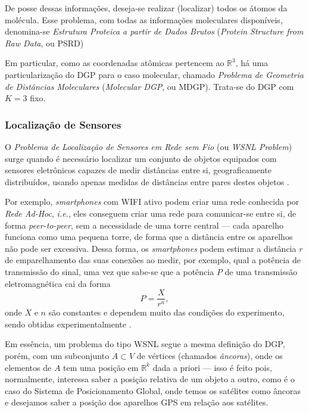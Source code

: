 De posse dessas informações, deseja-se realizar (localizar) todos os átomos da molécula. Esse problema, com todas as informações moleculares disponíveis, denomina-se \textit{Estrutura Proteica a partir de Dados Brutos} (\textit{Protein Structure from Raw Data}, ou PSRD)

Em particular, como as coordenadas atômicas pertencem ao $\mathbb{R}^3$, há uma particularização do DGP para o caso molecular, chamado \textit{Problema de Geometria de Distâncias Moleculares} (\textit{Molecular DGP}, ou MDGP). Trata-se do DGP com $K = 3$ fixo.

\subsubsection{Localização de Sensores}

O \textit{Problema de Localização de Sensores em Rede sem Fio} (ou \textit{WSNL Problem}) surge quando é necessário localizar um conjunto de objetos equipados com sensores eletrônicos capazes de medir distâncias entre si, geograficamente distribuídos, usando apenas medidas de distâncias entre pares destes objetos \cite{yemini1978positioning}. 

Por exemplo, \textit{smartphones} com WIFI ativo podem criar uma rede conhecida por \textit{Rede Ad-Hoc}, \textit{i.e.}, eles conseguem criar uma rede para comunicar-se entre si, de forma \textit{peer-to-peer}, sem a necessidade de uma torre central --- cada aparelho funciona como uma pequena torre, de forma que a distância entre os aparelhos não pode ser excessiva.
Dessa forma, os \textit{smartphones} podem estimar a distância $r$ de emparelhamento das suas conexões ao medir, por exemplo, qual a potência de transmissão do sinal, uma vez que sabe-se que a potência $P$ de uma transmissão eletromagnética cai da forma 
\begin{equation}
	P = \frac{X}{r^n},
\end{equation}
onde $X$ e $n$ são constantes e dependem muito das condições do experimento, sendo obtidas experimentalmente \cite{savvides2001dynamic}.

Em essência, um problema do tipo WSNL segue a mesma definição do DGP, porém, com um subconjunto $A\subset V$ de vértices (chamados \textit{âncoras}), onde os elementos de $A$ tem uma posição em $\mathbb{R}^k$ dada a priori --- isso é feito pois, normalmente, interessa saber a posição relativa de um objeto a outro, como é o caso do Sistema de Posicionamento Global, onde temos os satélites como âncoras e desejamos saber a posição dos aparelhos GPS em relação aos satélites.


